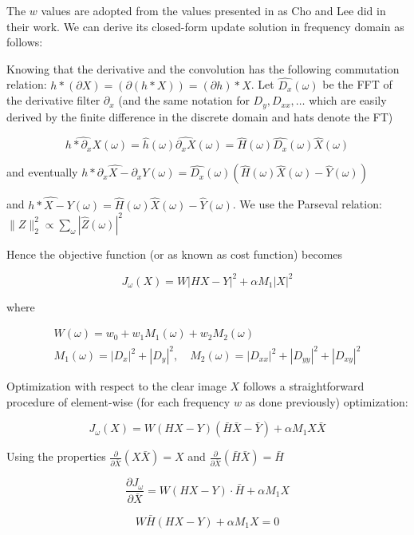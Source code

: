\documentclass{article}
\theoremstyle{definition}
\begin{document}
The $w$ values are adopted from the values presented in \cite{Shan} as Cho and Lee did in their work. We can derive its closed-form update solution in frequency domain as follows: 

Knowing that the derivative and the convolution has the following commutation relation: $h *(\partial X)=(\partial(h * X))=(\partial h) * X$. Let $\widehat{D_x}(\omega)$ be the FFT of the derivative filter $\partial_x$ (and the same notation for $D_y, D_{x x}, \ldots$ which are easily derived by the finite difference in the discrete domain and hats denote the FT) 

$$
\widehat{h * \partial_x X}(\omega)=\widehat{h}(\omega) \widehat{\partial_x X}(\omega)=\widehat{H}(\omega) \widehat{D_x}(\omega) \widehat{X}(\omega)
$$

and eventually $\widehat{h * \partial_x X-\partial_x Y}(\omega)=\widehat{D_x}(\omega)(\widehat{H}(\omega) \widehat{X}(\omega)-\widehat{Y}(\omega))$ 

and $\widehat{h * X-Y}(\omega)=\widehat{H}(\omega) \widehat{X}(\omega)-\widehat{Y}(\omega)$. We use the Parseval relation: $\|Z\|_2^2 \propto \sum_\omega|\widehat{Z}(\omega)|^2$

Hence the objective function (or as known as cost function) becomes 

$$
J_\omega(X)=W|H X-Y|^2+\alpha M_1|X|^2
$$

where 


$$
\begin{gathered}
W(\omega)=w_0+w_1 M_1(\omega)+w_2 M_2(\omega) \\
M_1(\omega)=\left|D_x\right|^2+\left|D_y\right|^2, \quad M_2(\omega)=\left|D_{x x}\right|^2+\left|D_{y y}\right|^2+\left|D_{x y}\right|^2
\end{gathered}
$$


Optimization with respect to the clear image $X$ follows a straightforward procedure of  element-wise (for each frequency $w$ as done previously) optimization:



$$
J_\omega(X)=W(H X-Y)(\bar{H} \bar{X}-\bar{Y})+\alpha M_1 X \bar{X}
$$

Using the properties $\frac{\partial}{\partial \bar{X}}(X \bar{X})=X$ and $\frac{\partial}{\partial \bar{X}}(\bar{H} \bar{X})=\bar{H}$

$$
\frac{\partial J_\omega}{\partial \bar{X}}=W(H X-Y) \cdot \bar{H}+\alpha M_1 X
$$


$$
W \bar{H}(H X-Y)+\alpha M_1 X=0
$$
\end{document}
